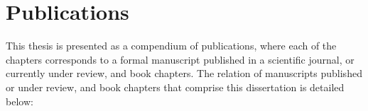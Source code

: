 \chapter*{Publications}



This thesis is presented as a compendium of publications, where each of the chapters corresponds to a formal manuscript published in a scientific journal, or currently under review, and book chapters. The relation of
manuscripts published or under review, and book chapters that comprise this dissertation is detailed below:

%	

\begin{refsection}[ownpubs]
	\nocite{Policies, Tool, martin2020model, martin2020optimal, Martin, martin2021logistics}
	\printbibliography[heading=none]%
\end{refsection}

